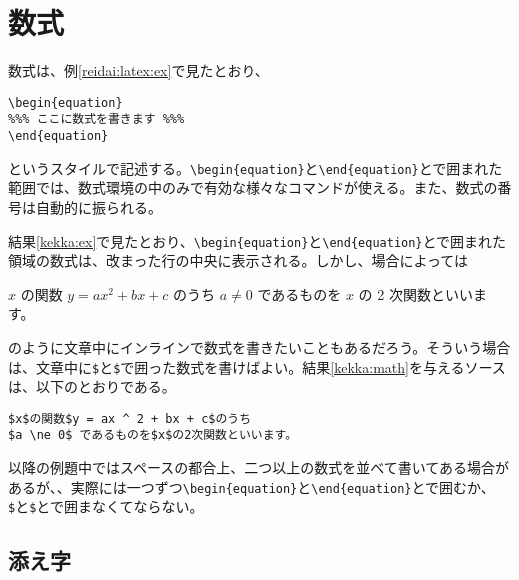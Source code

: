 \section{数式}
\label{sec:latex:math}

数式は、例\ref{reidai:latex:ex}で見たとおり、
\begin{reidai}
\begin{verbatim}
\begin{equation}
%%% ここに数式を書きます %%%
\end{equation}
\end{verbatim}
\end{reidai} \noindent
というスタイルで記述する。\verb|\begin{equation}|と\verb|\end{equation}|とで囲まれた範囲では、数式環境の中のみで有効な様々なコマンドが使える。また、数式の番号は自動的に振られる。

結果\ref{kekka:ex}で見たとおり、\verb|\begin{equation}|と\verb|\end{equation}|とで囲まれた領域の数式は、改まった行の中央に表示される。しかし、場合によっては
\addtocounter{reidai}{1}
\begin{kekka}
  \label{kekka:math}
  $x$ の関数 $y = ax ^ 2 + bx + c$ のうち
  $a \ne 0$ であるものを $x$ の 2 次関数といいます。
\end{kekka} \noindent
のように文章中にインラインで数式を書きたいこともあるだろう。そういう場合は、文章中に\texttt{\$}と\texttt{\$}で囲った数式を書けばよい。結果\ref{kekka:math}を与えるソースは、以下のとおりである。\addtocounter{reidai}{-1}
\begin{reidai}
\begin{verbatim}
$x$の関数$y = ax ^ 2 + bx + c$のうち
$a \ne 0$ であるものを$x$の2次関数といいます。
\end{verbatim}
\end{reidai} \noindent
以降の例題中ではスペースの都合上、二つ以上の数式を並べて書いてある場合があるが、、実際には一つずつ\verb|\begin{equation}|と\verb|\end{equation}|とで囲むか、\texttt{\$}と\texttt{\$}とで囲まなくてならない。

\subsection{添え字}
\label{sec:latex:index}


